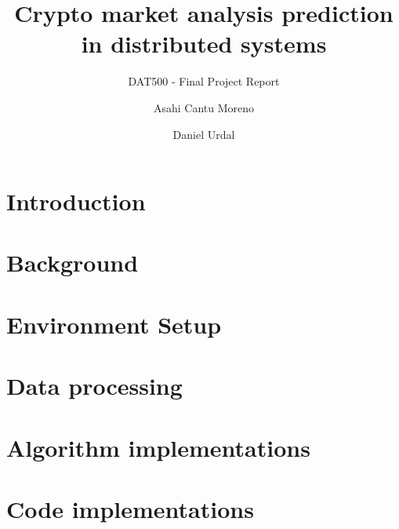 \documentclass[sigconf]{acmart}
\begin{document}
\title{Crypto market analysis prediction in distributed systems}
\subtitle{DAT500 - Final Project Report}

\author{Asahi Cantu Moreno}

\author{Daniel Urdal}




\begin{abstract}

\end{abstract}


\maketitle

\section{Introduction}
\label{sec:introduction}


\section{Background}
\label{sec:background}


\section{Environment Setup}
\label{sec:method}


\section{Data processing}
\label{sec:method}


\section{Algorithm implementations}
\label{sec:method}


\section{Code implementations}
\label{sec:method}

\end{document}
